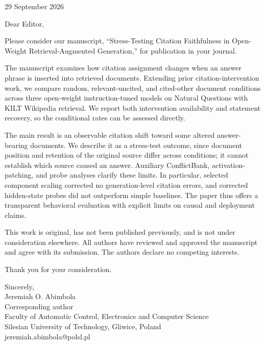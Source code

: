 \documentclass[11pt]{article}
\begin{document}
\begin{flushright}
29 September 2026
\end{flushright}

Dear Editor,

Please consider our manuscript, ``Stress-Testing Citation Faithfulness in Open-Weight Retrieval-Augmented Generation,'' for publication in your journal.

The manuscript examines how citation assignment changes when an answer phrase is inserted into retrieved documents. Extending prior citation-intervention work, we compare random, relevant-uncited, and cited-other document conditions across three open-weight instruction-tuned models on Natural Questions with KILT Wikipedia retrieval. We report both intervention availability and statement recovery, so the conditional rates can be assessed directly.

The main result is an observable citation shift toward some altered answer-bearing documents. We describe it as a stress-test outcome, since document position and retention of the original source differ across conditions; it cannot establish which source caused an answer. Auxiliary ConflictBank, activation-patching, and probe analyses clarify these limits. In particular, selected component scaling corrected no generation-level citation errors, and corrected hidden-state probes did not outperform simple baselines. The paper thus offers a transparent behavioral evaluation with explicit limits on causal and deployment claims.

This work is original, has not been published previously, and is not under consideration elsewhere. All authors have reviewed and approved the manuscript and agree with its submission. The authors declare no competing interests.

Thank you for your consideration.

Sincerely,\\[0.5em]
Jeremiah O. Abimbola\\
Corresponding author\\
Faculty of Automatic Control, Electronics and Computer Science\\
Silesian University of Technology, Gliwice, Poland\\
jeremiah.abimbola@polsl.pl
\end{document}
